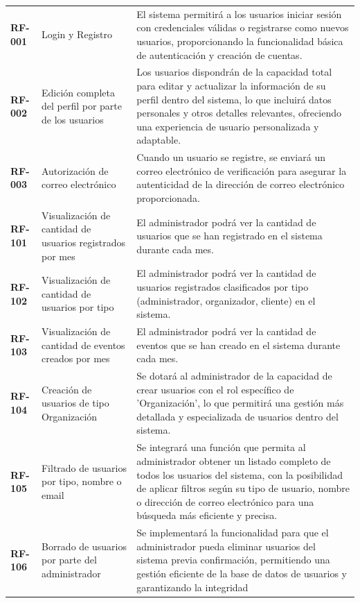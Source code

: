 \begin{longtable}{ p{2.5cm} p{4cm} p{9cm}  }
    \textbf{RF-001}& Login y Registro & El sistema permitirá a los usuarios iniciar sesión con credenciales válidas o registrarse como nuevos 
    usuarios, proporcionando la funcionalidad básica de autenticación y creación de cuentas.\\
    \textbf{RF-002} & Edición completa del perfil por parte de los usuarios & Los usuarios dispondrán de la capacidad total para editar y
    actualizar la información de su perfil dentro del sistema, lo que incluirá datos personales y otros detalles relevantes, ofreciendo una 
    experiencia de usuario personalizada y adaptable.\\
    \textbf{RF-003} & Autorización de correo electrónico & Cuando un usuario se registre, se enviará un correo electrónico de verificación para 
    asegurar la autenticidad de la dirección de correo electrónico proporcionada.\\
    \textbf{RF-101} & Visualización de cantidad de usuarios registrados por mes & El administrador podrá ver la cantidad de usuarios que se han 
    registrado en el sistema durante cada mes.\\
    \textbf{RF-102} & Visualización de cantidad de usuarios por tipo & El administrador podrá ver la cantidad de usuarios registrados clasificados 
    por tipo (administrador, organizador, cliente) en el sistema.\\
    \textbf{RF-103} & Visualización de cantidad de eventos creados por mes & El administrador podrá ver la cantidad de eventos que se han creado en 
    el sistema durante cada mes.\\
    \textbf{RF-104} & Creación de usuarios de tipo Organización & Se dotará al administrador de la capacidad de crear usuarios con el rol específico 
    de 'Organización', lo que permitirá una gestión más detallada y especializada de usuarios dentro del sistema.\\
    \textbf{RF-105} & Filtrado de usuarios por tipo, nombre o email & Se integrará una función que permita al administrador obtener un 
    listado completo de todos los usuarios del sistema, con la posibilidad de aplicar filtros según su tipo de usuario, nombre o dirección 
    de correo electrónico para una búsqueda más eficiente y precisa.\\
    \textbf{RF-106} & Borrado de usuarios por parte del administrador & Se implementará la funcionalidad para que el administrador pueda 
    eliminar usuarios del sistema previa confirmación, permitiendo una gestión eficiente de la base de datos de usuarios y garantizando la integridad 

\end{longtable}
